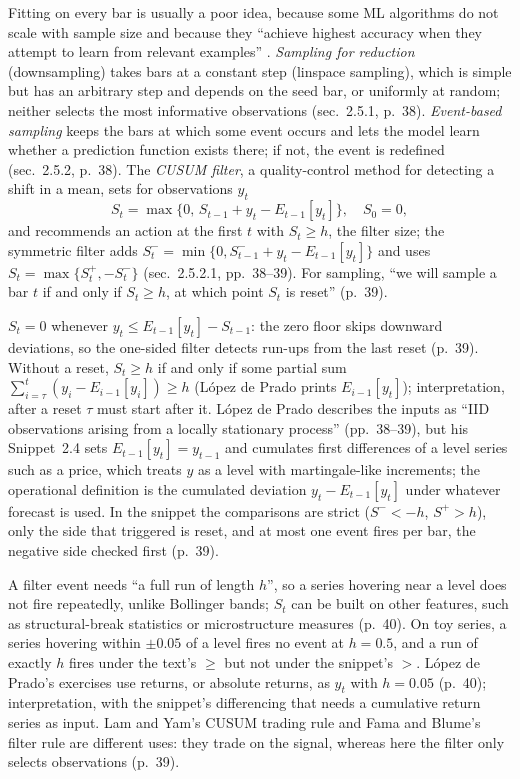 \begin{qfmethod}\label{meth:event-based-sampling}
 Fitting on every bar is usually a poor idea, because some ML algorithms do not scale with sample size and because they ``achieve highest accuracy when they attempt to learn from relevant examples'' \citep[chap.~2, sec.~2.5, p.~38]{alpha-afml}. \emph{Sampling for reduction} (downsampling) takes bars at a constant step (linspace sampling), which is simple but has an arbitrary step and depends on the seed bar, or uniformly at random; neither selects the most informative observations (sec.~2.5.1, p.~38). \emph{Event-based sampling} keeps the bars at which some event occurs and lets the model learn whether a prediction function exists there; if not, the event is redefined (sec.~2.5.2, p.~38). The \emph{CUSUM filter}, a quality-control method for detecting a shift in a mean, sets for observations $y_t$
\[ S_t=\max\{0,\,S_{t-1}+y_t-E_{t-1}[y_t]\},\quad S_0=0, \]
and recommends an action at the first $t$ with $S_t\ge h$, the filter size; the symmetric filter adds $S_t^-=\min\{0,S^-_{t-1}+y_t-E_{t-1}[y_t]\}$ and uses $S_t=\max\{S_t^+,-S_t^-\}$ (sec.~2.5.2.1, pp.~38--39). For sampling, ``we will sample a bar $t$ if and only if $S_t\ge h$, at which point $S_t$ is reset'' (p.~39).

 $S_t=0$ whenever $y_t\le E_{t-1}[y_t]-S_{t-1}$: the zero floor skips downward deviations, so the one-sided filter detects run-ups from the last reset (p.~39). Without a reset, $S_t\ge h$ if and only if some partial sum $\sum_{i=\tau}^t(y_i-E_{i-1}[y_i])\ge h$ (López de Prado prints $E_{i-1}[y_t]$); interpretation, after a reset $\tau$ must start after it. López de Prado describes the inputs as ``IID observations arising from a locally stationary process'' (pp.~38--39), but his Snippet~2.4 sets $E_{t-1}[y_t]=y_{t-1}$ and cumulates first differences of a level series such as a price, which treats $y$ as a level with martingale-like increments; the operational definition is the cumulated deviation $y_t-E_{t-1}[y_t]$ under whatever forecast is used. In the snippet the comparisons are strict ($S^-<-h$, $S^+>h$), only the side that triggered is reset, and at most one event fires per bar, the negative side checked first (p.~39).

 A filter event needs ``a full run of length $h$'', so a series hovering near a level does not fire repeatedly, unlike Bollinger bands; $S_t$ can be built on other features, such as structural-break statistics or microstructure measures (p.~40). On toy series, a series hovering within $\pm0.05$ of a level fires no event at $h=0.5$, and a run of exactly $h$ fires under the text's $\ge$ but not under the snippet's $>$. López de Prado's exercises use returns, or absolute returns, as $y_t$ with $h=0.05$ (p.~40); interpretation, with the snippet's differencing that needs a cumulative return series as input. Lam and Yam's CUSUM trading rule and Fama and Blume's filter rule are different uses: they trade on the signal, whereas here the filter only selects observations (p.~39).


\end{qfmethod}
